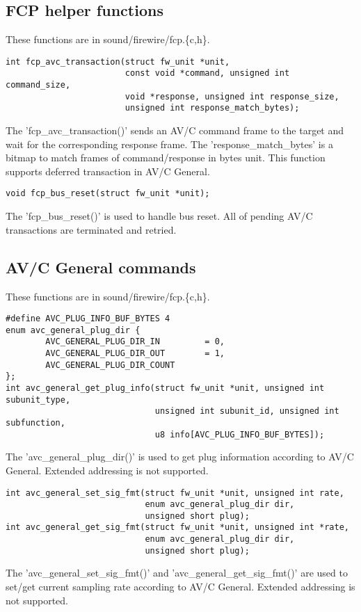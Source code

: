 \documentclass[onecolumn]{jarticle}
\begin{document}
\subsection{FCP helper functions}

These functions are in sound/firewire/fcp.\{c,h\}.

\begin{verbatim}
int fcp_avc_transaction(struct fw_unit *unit,
                        const void *command, unsigned int command_size,
                        void *response, unsigned int response_size,
                        unsigned int response_match_bytes);
\end{verbatim}

The 'fcp\_avc\_transaction()' sends an AV/C command frame to the target and wait for the corresponding response frame. The 'response\_match\_bytes' is a bitmap to match frames of command/response in bytes unit. This function supports deferred transaction in AV/C General\cite{avc-general-4-2}.

\begin{verbatim}
void fcp_bus_reset(struct fw_unit *unit);
\end{verbatim}

The 'fcp\_bus\_reset()' is used to handle bus reset. All of pending AV/C transactions are terminated and retried. 


\subsection{AV/C General commands}

These functions are in sound/firewire/fcp.\{c,h\}.

\begin{verbatim}
#define AVC_PLUG_INFO_BUF_BYTES 4
enum avc_general_plug_dir {
        AVC_GENERAL_PLUG_DIR_IN         = 0,
        AVC_GENERAL_PLUG_DIR_OUT        = 1,
        AVC_GENERAL_PLUG_DIR_COUNT
};
int avc_general_get_plug_info(struct fw_unit *unit, unsigned int subunit_type,
                              unsigned int subunit_id, unsigned int subfunction,
                              u8 info[AVC_PLUG_INFO_BUF_BYTES]);
\end{verbatim}

The 'avc\_general\_plug\_dir()' is used to get plug information according to AV/C General\cite{avc-general-4-2}. Extended addressing is not supported.

\begin{verbatim}
int avc_general_set_sig_fmt(struct fw_unit *unit, unsigned int rate,
                            enum avc_general_plug_dir dir,
                            unsigned short plug);
int avc_general_get_sig_fmt(struct fw_unit *unit, unsigned int *rate,
                            enum avc_general_plug_dir dir,
                            unsigned short plug);
\end{verbatim}

The 'avc\_general\_set\_sig\_fmt()' and 'avc\_general\_get\_sig\_fmt()' are used to set/get current sampling rate according to AV/C General\cite{avc-general-4-2}. Extended addressing is not supported.
\end{document}
